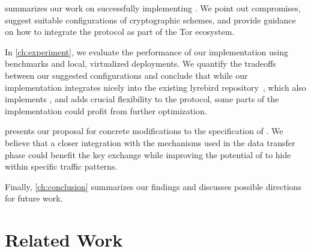  summarizes our work on successfully implementing \drivel{}. We point out compromises, suggest suitable configurations of cryptographic schemes, and provide guidance on how to integrate the \drivel{} protocol as part of the Tor ecosystem.

In \cref{ch:experiment}, we evaluate the performance of our implementation using benchmarks and local, virtualized deployments. We quantify the tradeoffs between our suggested configurations and conclude that while our implementation integrates nicely into the existing lyrebird repository~\cite{lyrebird}, which also implements \obfsfour{}, and adds crucial flexibility to the protocol, some parts of the implementation could profit from further optimization.

 presents our proposal for concrete modifications to the \drivel{} specification of \cite{EPRINT:GRSV25}. We believe that a closer integration with the mechanisms used in the data transfer phase could benefit the key exchange while improving the potential of \drivel{} to hide within specific traffic patterns.

Finally, \cref{ch:conclusion} summarizes our findings and discusses possible directions for future work.

\section{Related Work} \label{sec:related-work}

